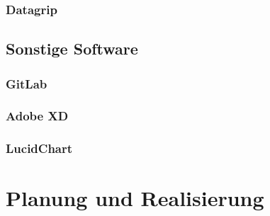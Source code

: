 \documentclass{report}
\begin{document}
\subsection{Datagrip}
\section{Sonstige Software}
\subsection{GitLab}
\subsection{Adobe XD}
\subsection{LucidChart}

\chapter{Planung und Realisierung}
\end{document}
